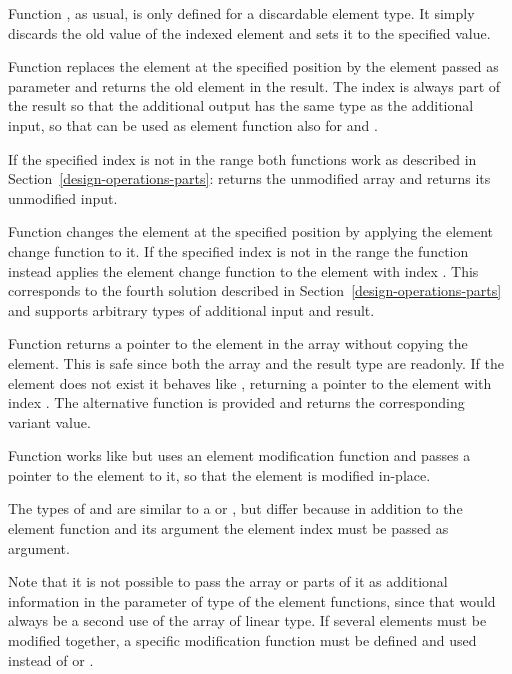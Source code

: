 Function , as usual, is only defined for a discardable element type. 
It simply discards the old value of the indexed element and sets it to the specified value.

Function 
replaces the element at the specified position by the element passed as parameter and returns the old element in the result.
The index is always part of the result so that the additional output has the same type as the additional input,
so that  can be used as element function also for  and .

If the specified
index is not in the range  both functions work as described in Section~\ref{design-operations-parts}:
 returns the unmodified array and  returns its unmodified input.

Function  changes the element at the specified position by applying the element change function
to it. If the specified
index is not in the range  the function instead applies the element change function to the element
with index . This corresponds to the fourth solution described in Section~\ref{design-operations-parts}
and supports arbitrary types of additional input and result. 

Function  returns a pointer to the element in the array without copying the element. This is safe since 
both the array and the result type are readonly. If the element does not exist it behaves like , returning 
a pointer to the element with index . The alternative function  is provided and returns the 
corresponding variant value.

Function  works like  but uses an
element modification function and passes a pointer to the element to it, so that the element is modified in-place.

The types of  and  are similar to a 
 or , but differ because in addition to the 
element function and its argument the element index must be passed as argument.

Note that it is not possible
to pass the array or parts of it as additional information in the parameter of type  of the element
functions, since that would always be
a second use of the array of linear type. If several elements must be modified together, a specific modification function
must be defined and used instead of  or .

